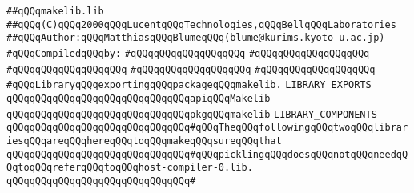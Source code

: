 \label{src/lib/core/makelib/makelib.lib}
\verb|##qQQqmakelib.lib|\newline
\verb|##qQQq(C)qQQq2000qQQqLucentqQQqTechnologies,qQQqBellqQQqLaboratories|\newline
\verb|##qQQqAuthor:qQQqMatthiasqQQqBlumeqQQq(blume@kurims.kyoto-u.ac.jp)|\newline
\newline
\verb|#qQQqCompiledqQQqby:|\newline
\verb|#qQQqqQQqqQQqqQQqqQQq|\newline
\verb|#qQQqqQQqqQQqqQQqqQQq|\newline
\verb|#qQQqqQQqqQQqqQQqqQQq|\newline
\verb|#qQQqqQQqqQQqqQQqqQQq|\newline
\verb|#qQQqqQQqqQQqqQQqqQQq|\newline
\newline
\verb|#qQQqLibraryqQQqexportingqQQqpackageqQQqmakelib.|\newline
\newline
\newline
\verb|LIBRARY_EXPORTS|\newline
\newline
\verb|qQQqqQQqqQQqqQQqqQQqqQQqqQQqqQQqapiqQQqMakelib|\newline
\verb|qQQqqQQqqQQqqQQqqQQqqQQqqQQqqQQqpkgqQQqmakelib|\newline
\newline
\newline
\verb|LIBRARY_COMPONENTS|\newline
\newline
\verb|qQQqqQQqqQQqqQQqqQQqqQQqqQQqqQQq#qQQqTheqQQqfollowingqQQqtwoqQQqlibrariesqQQqareqQQqhereqQQqtoqQQqmakeqQQqsureqQQqthat|\newline
\verb|qQQqqQQqqQQqqQQqqQQqqQQqqQQqqQQq#qQQqpicklingqQQqdoesqQQqnotqQQqneedqQQqtoqQQqreferqQQqtoqQQqhost-compiler-0.lib.|\newline
\verb|qQQqqQQqqQQqqQQqqQQqqQQqqQQqqQQq#|\newline
